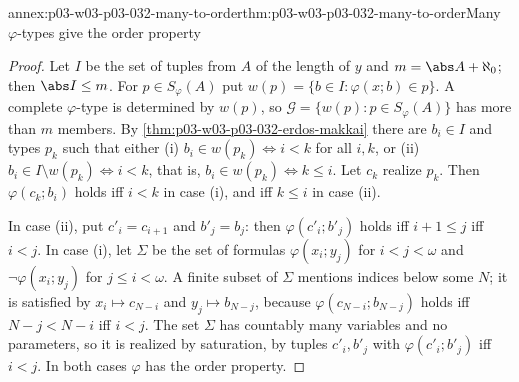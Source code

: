 \begin{annexitem}{annex:p03-w03-p03-032-many-to-order}{thm:p03-w03-p03-032-many-to-order}{Many \(\varphi\)-types give the order property}
\begin{proof}
Let \(I\) be the set of tuples from \(A\) of the length of \(y\) and
\(m=\abs A+\aleph_0\); then \(\abs I\leq m\).  For \(p\in S_\varphi(A)\) put
\(w(p)=\{b\in I:\varphi(x;b)\in p\}\).  A complete \(\varphi\)-type is
determined by \(w(p)\), so \(\mathcal G=\{w(p):p\in S_\varphi(A)\}\) has more
than \(m\) members.  By \cref{thm:p03-w03-p03-032-erdos-makkai} there are
\(b_i\in I\) and types \(p_k\) such that either (i)
\(b_i\in w(p_k)\Leftrightarrow i<k\) for all \(i,k\), or (ii)
\(b_i\in I\setminus w(p_k)\Leftrightarrow i<k\), that is,
\(b_i\in w(p_k)\Leftrightarrow k\leq i\).  Let \(c_k\) realize \(p_k\).
Then \(\varphi(c_k;b_i)\) holds iff \(i<k\) in case (i), and iff \(k\leq i\) in
case (ii).

In case (ii), put \(c'_i=c_{i+1}\) and \(b'_j=b_j\): then
\(\varphi(c'_i;b'_j)\) holds iff \(i+1\leq j\) iff \(i<j\).  In case (i), let
\(\Sigma\) be the set of formulas \(\varphi(x_i;y_j)\) for \(i<j<\omega\)
and \(\neg\varphi(x_i;y_j)\) for \(j\leq i<\omega\).  A finite subset of
\(\Sigma\) mentions indices below some \(N\); it is satisfied by
\(x_i\mapsto c_{N-i}\) and \(y_j\mapsto b_{N-j}\), because
\(\varphi(c_{N-i};b_{N-j})\) holds iff \(N-j<N-i\) iff \(i<j\).  The set
\(\Sigma\) has countably many variables and no parameters, so it is realized
by saturation, by tuples \(c'_i,b'_j\) with \(\varphi(c'_i;b'_j)\)
iff \(i<j\).  In both cases \(\varphi\) has the order property.
\end{proof}
\end{annexitem}


